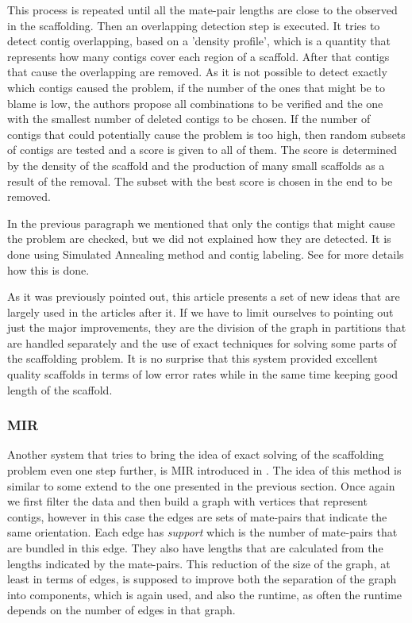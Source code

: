 \documentclass[11pt]{article}
\begin{document}
This process is repeated until all the mate-pair lengths are close to the
observed in the scaffolding. Then an overlapping detection step is executed. It
tries to detect contig overlapping, based on a 'density profile', which is a
quantity that represents how many contigs cover each region of a scaffold. After
that contigs that cause the overlapping are removed. As it is not possible to
detect exactly which contigs caused the problem, if the number of the ones that
might be to blame is low, the authors propose all combinations to be verified
and the one with the smallest number of deleted contigs to be chosen. If the
number of contigs that could potentially cause the problem is too high, then
random subsets of contigs are tested and a score is given to all of them. The
score is determined by the density of the scaffold and the production of many
small scaffolds as a result of the removal. The subset with the best score is
chosen in the end to be removed.

In the previous paragraph we mentioned that only the contigs that might cause
the problem are checked, but we did not explained how they are detected. It is
done using Simulated Annealing method and contig labeling. See \cite{SOPRA} for
more details how this is done.

As it was previously pointed out, this article presents a set of new ideas that
are largely used in the articles after it. If we have to limit ourselves to
pointing out just the major improvements, they are the division of the graph in
partitions that are handled separately and the use of exact techniques for
solving some parts of the scaffolding problem. It is no surprise that this
system provided excellent quality scaffolds in terms of low error rates while in
the same time keeping good length of the scaffold.

\subsubsection{MIR} %
\label{ssub:MIR}
Another system that tries to bring the idea of exact solving of the scaffolding
problem even one step further, is MIR introduced in \cite{MIR}. The idea of this
method is similar to some extend to the one presented in the previous section.
Once again we first filter the data and then build a graph with vertices that
represent contigs, however in this case the edges are sets of mate-pairs that
indicate the same orientation. Each edge has \emph{support} which is the number
of mate-pairs that are bundled in this edge.  They also have lengths that are
calculated from the lengths indicated by the mate-pairs. This reduction of the
size of the graph, at least in terms of edges, is supposed to improve both the
separation of the graph into components, which is again used, and also the
runtime, as often the runtime depends on the number of edges in that graph.
\end{document}
